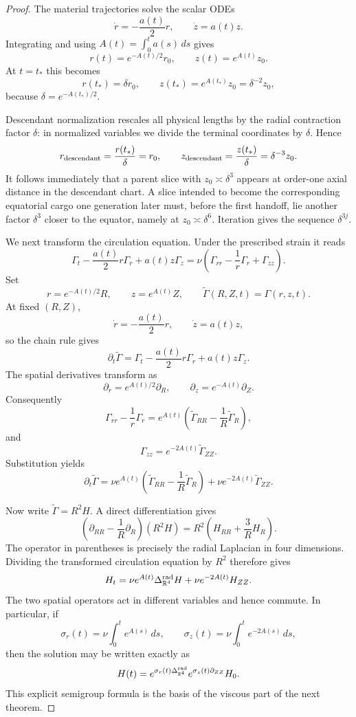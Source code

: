 \documentclass[11pt]{article}
\theoremstyle{definition}\newtheorem{definition}[theorem]{Definition}
\theoremstyle{remark}\newtheorem{remark}[theorem]{Remark}
\newcommand{\R}{\mathbb R}\newcommand{\dd}{\,d}\newcommand{\HH}{\mathcal H}
\begin{document}
\begin{proof}
The material trajectories solve the scalar ODEs
\[
 \dot r=-\frac{a(t)}2r,
 \qquad
 \dot z=a(t)z.
\]
Integrating and using $A(t)=\int_0^ta(s)\,ds$ gives
\[
 r(t)=e^{-A(t)/2}r_0,
 \qquad
 z(t)=e^{A(t)}z_0.
\]
At $t=t_*$ this becomes
\[
 r(t_*)=\delta r_0,
 \qquad
 z(t_*)=e^{A(t_*)}z_0=\delta^{-2}z_0,
\]
because $\delta=e^{-A(t_*)/2}$.

Descendant normalization rescales all physical lengths by the radial contraction factor $\delta$: in normalized variables we divide the terminal coordinates by $\delta$.  Hence
\[
 r_{\rm descendant}=\frac{r(t_*)}{\delta}=r_0,
 \qquad
 z_{\rm descendant}=\frac{z(t_*)}{\delta}=\delta^{-3}z_0.
\]
It follows immediately that a parent slice with $z_0\asymp\delta^3$ appears at order-one axial distance in the descendant chart.  A slice intended to become the corresponding equatorial cargo one generation later must, before the first handoff, lie another factor $\delta^3$ closer to the equator, namely at $z_0\asymp\delta^6$.  Iteration gives the sequence $\delta^{3j}$.

We next transform the circulation equation.  Under the prescribed strain it reads
\[
 \Gamma_t-\frac{a(t)}2r\Gamma_r+a(t)z\Gamma_z
 =\nu\left(\Gamma_{rr}-\frac1r\Gamma_r+\Gamma_{zz}\right).
\]
Set
\[
 r=e^{-A(t)/2}R,
 \qquad
 z=e^{A(t)}Z,
 \qquad
 \widetilde\Gamma(R,Z,t)=\Gamma(r,z,t).
\]
At fixed $(R,Z)$,
\[
 \dot r=-\frac{a(t)}2r,
 \qquad
 \dot z=a(t)z,
\]
so the chain rule gives
\[
 \partial_t\widetilde\Gamma
 =\Gamma_t-\frac{a(t)}2r\Gamma_r+a(t)z\Gamma_z.
\]
The spatial derivatives transform as
\[
 \partial_r=e^{A(t)/2}\partial_R,
 \qquad
 \partial_z=e^{-A(t)}\partial_Z.
\]
Consequently
\[
 \Gamma_{rr}-\frac1r\Gamma_r
 =e^{A(t)}\left(\widetilde\Gamma_{RR}-\frac1R\widetilde\Gamma_R\right),
\]
and
\[
 \Gamma_{zz}=e^{-2A(t)}\widetilde\Gamma_{ZZ}.
\]
Substitution yields
\[
 \partial_t\widetilde\Gamma
 =\nu e^{A(t)}\left(\widetilde\Gamma_{RR}-\frac1R\widetilde\Gamma_R\right)
 +\nu e^{-2A(t)}\widetilde\Gamma_{ZZ}.
\]

Now write $\widetilde\Gamma=R^2H$.  A direct differentiation gives
\[
 \left(\partial_{RR}-\frac1R\partial_R\right)(R^2H)
 =R^2\left(H_{RR}+\frac3RH_R\right).
\]
The operator in parentheses is precisely the radial Laplacian in four dimensions.  Dividing the transformed circulation equation by $R^2$ therefore gives
\[
 H_t
 =\nu e^{A(t)}\Delta_{\R^4}^{\rm rad}H
 +\nu e^{-2A(t)}H_{ZZ}.
\]
The two spatial operators act in different variables and hence commute.  In particular, if
\[
 \sigma_r(t)=\nu\int_0^t e^{A(s)}\,ds,
 \qquad
 \sigma_z(t)=\nu\int_0^t e^{-2A(s)}\,ds,
\]
then the solution may be written exactly as
\[
 H(t)=e^{\sigma_r(t)\Delta_{\R^4}^{\rm rad}}
      e^{\sigma_z(t)\partial_{ZZ}}H_0.
\]
This explicit semigroup formula is the basis of the viscous part of the next theorem.
\end{proof}
\end{document}
